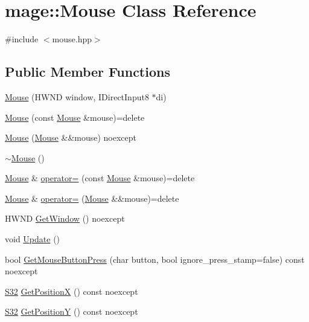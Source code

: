 \hypertarget{classmage_1_1_mouse}{}\section{mage\+:\+:Mouse Class Reference}
\label{classmage_1_1_mouse}


{\ttfamily \#include $<$mouse.\+hpp$>$}

\subsection*{Public Member Functions}
\begin{DoxyCompactItemize}
\item 
\hyperlink{classmage_1_1_mouse_a14a0dd65d468158d2f967b93e820d84c}{Mouse} (H\+W\+ND window, I\+Direct\+Input8 $\ast$di)
\item 
\hyperlink{classmage_1_1_mouse_af11aa23e6cfbefb4cd3d90b17c63db7c}{Mouse} (const \hyperlink{classmage_1_1_mouse}{Mouse} \&mouse)=delete
\item 
\hyperlink{classmage_1_1_mouse_aab728705e2e290da23fef77f60b3fc2c}{Mouse} (\hyperlink{classmage_1_1_mouse}{Mouse} \&\&mouse) noexcept
\item 
\hyperlink{classmage_1_1_mouse_a855f1075ae774c8417d3da7a1e02d580}{$\sim$\+Mouse} ()
\item 
\hyperlink{classmage_1_1_mouse}{Mouse} \& \hyperlink{classmage_1_1_mouse_a585119f1b0db3fbc7436c86676518c8c}{operator=} (const \hyperlink{classmage_1_1_mouse}{Mouse} \&mouse)=delete
\item 
\hyperlink{classmage_1_1_mouse}{Mouse} \& \hyperlink{classmage_1_1_mouse_a42d80f535a12356762a506438036dd71}{operator=} (\hyperlink{classmage_1_1_mouse}{Mouse} \&\&mouse)=delete
\item 
H\+W\+ND \hyperlink{classmage_1_1_mouse_a8d6b15af2bb60cc38334255ad2fbe576}{Get\+Window} () noexcept
\item 
void \hyperlink{classmage_1_1_mouse_a0cddae3f871dd69c1ba6928dc6b1f985}{Update} ()
\item 
bool \hyperlink{classmage_1_1_mouse_a240b7fe1d68448fa922d769187f6358a}{Get\+Mouse\+Button\+Press} (char button, bool ignore\+\_\+press\+\_\+stamp=false) const noexcept
\item 
\hyperlink{namespacemage_a642e05c5c83642b6946703615cdbf2da}{S32} \hyperlink{classmage_1_1_mouse_a0b7b47556aaa6e620d852349e21ba4af}{Get\+PositionX} () const noexcept
\item 
\hyperlink{namespacemage_a642e05c5c83642b6946703615cdbf2da}{S32} \hyperlink{classmage_1_1_mouse_a4df9cf5c235c44a5988cd451b8ca3ddb}{Get\+PositionY} () const noexcept

\end{DoxyCompactItemize}
